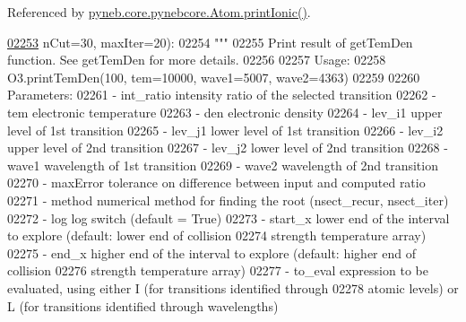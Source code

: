 Referenced by \hyperlink{pynebcore_8py_source_l02167}{pyneb.\+core.\+pynebcore.\+Atom.\+print\+Ionic()}.


\begin{DoxyCode}
\hypertarget{classpyneb_1_1core_1_1pynebcore_1_1_atom_l02253}{}\hyperlink{classpyneb_1_1core_1_1pynebcore_1_1_atom_a0b95239f3b76bbd0e42da220370ff866}{02253}                     nCut=30, maxIter=20):
02254         \textcolor{stringliteral}{""" }
02255 \textcolor{stringliteral}{        Print result of getTemDen function. See getTemDen for more details.}
02256 \textcolor{stringliteral}{        }
02257 \textcolor{stringliteral}{        Usage:}
02258 \textcolor{stringliteral}{            O3.printTemDen(100, tem=10000, wave1=5007, wave2=4363)}
02259 \textcolor{stringliteral}{        }
02260 \textcolor{stringliteral}{        Parameters:}
02261 \textcolor{stringliteral}{            - int\_ratio    intensity ratio of the selected transition}
02262 \textcolor{stringliteral}{            - tem          electronic temperature}
02263 \textcolor{stringliteral}{            - den          electronic density}
02264 \textcolor{stringliteral}{            - lev\_i1       upper level of 1st transition}
02265 \textcolor{stringliteral}{            - lev\_j1       lower level of 1st transition}
02266 \textcolor{stringliteral}{            - lev\_i2       upper level of 2nd transition}
02267 \textcolor{stringliteral}{            - lev\_j2       lower level of 2nd transition}
02268 \textcolor{stringliteral}{            - wave1        wavelength of 1st transition}
02269 \textcolor{stringliteral}{            - wave2        wavelength of 2nd transition}
02270 \textcolor{stringliteral}{            - maxError     tolerance on difference between input and computed ratio }
02271 \textcolor{stringliteral}{            - method       numerical method for finding the root (nsect\_recur, nsect\_iter)}
02272 \textcolor{stringliteral}{            - log          log switch (default = True)}
02273 \textcolor{stringliteral}{            - start\_x      lower end of the interval to explore (default: lower end of collision }
02274 \textcolor{stringliteral}{                            strength temperature array)}
02275 \textcolor{stringliteral}{            - end\_x        higher end of the interval to explore (default: higher end of collision }
02276 \textcolor{stringliteral}{                            strength temperature array)}
02277 \textcolor{stringliteral}{            - to\_eval      expression to be evaluated, using either I (for transitions identified through }
02278 \textcolor{stringliteral}{                            atomic levels) or L (for transitions identified through wavelengths)}

\end{DoxyCode}
